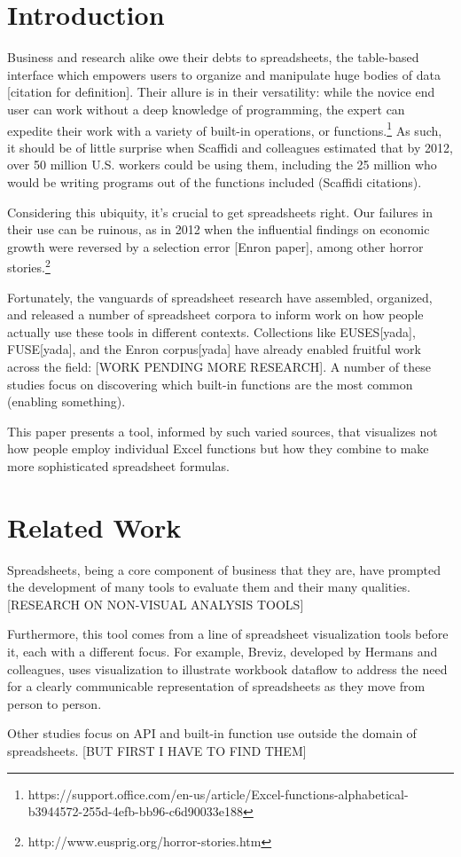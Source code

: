 \documentclass[conference]{IEEEtran}
\begin{document}
\section{Introduction}
Business and research alike owe their debts to spreadsheets, the table-based interface which empowers users to organize and manipulate huge bodies of data [citation for definition]. Their allure is in their versatility: while the novice end user can work without a deep knowledge of programming, the expert can expedite their work with a variety of built-in operations, or functions.\footnote{https://support.office.com/en-us/article/Excel-functions-alphabetical-b3944572-255d-4efb-bb96-c6d90033e188} As such, it should be of little surprise when Scaffidi and colleagues estimated that by 2012, over 50 million U.S. workers could be using them, including the 25 million who would be writing programs out of the functions included (Scaffidi citations).\par

Considering this ubiquity, it's crucial to get spreadsheets right. Our failures in their use can be ruinous, as in 2012 when the influential findings on economic growth were reversed by a selection error [Enron paper], among other horror stories.\footnote{http://www.eusprig.org/horror-stories.htm}

Fortunately, the vanguards of spreadsheet research have assembled, organized, and released a number of spreadsheet corpora to inform work on how people actually use these tools in different contexts. Collections like EUSES[yada], FUSE[yada], and the Enron corpus[yada] have already enabled fruitful work across the field: [WORK PENDING MORE RESEARCH]. A number of these studies focus on discovering which built-in functions are the most common (enabling something). \par

This paper presents a tool, informed by such varied sources, that visualizes not how people employ individual Excel functions but how they combine to make more sophisticated spreadsheet formulas. 


\section{Related Work}
Spreadsheets, being a core component of business that they are, have prompted the development of many tools to evaluate them and their many qualities. [RESEARCH ON NON-VISUAL ANALYSIS TOOLS] \par
Furthermore, this tool comes from a line of spreadsheet visualization tools before it, each with a different focus. For example, Breviz, developed by Hermans and colleagues, uses visualization to illustrate workbook dataflow to address the need for a clearly communicable representation of spreadsheets as they move from person to person. \par
Other studies focus on API and built-in function use outside the domain of spreadsheets. [BUT FIRST I HAVE TO FIND THEM]  
\end{document}
